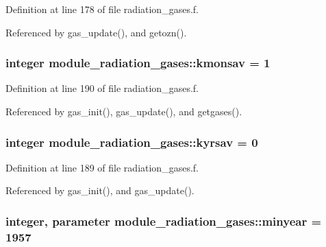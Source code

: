 Definition at line 178 of file radiation\+\_\+gases.\+f.



Referenced by gas\+\_\+update(), and getozn().

\subsubsection[{\texorpdfstring{kmonsav}{kmonsav}}]{\setlength{\rightskip}{0pt plus 5cm}integer module\+\_\+radiation\+\_\+gases\+::kmonsav = 1\hspace{0.3cm}{\ttfamily [private]}}\hypertarget{group__module__radiation__gases_gab1cf1b63398a3e7ec0334a7c97258b4d}{}\label{group__module__radiation__gases_gab1cf1b63398a3e7ec0334a7c97258b4d}


Definition at line 190 of file radiation\+\_\+gases.\+f.



Referenced by gas\+\_\+init(), gas\+\_\+update(), and getgases().

\subsubsection[{\texorpdfstring{kyrsav}{kyrsav}}]{\setlength{\rightskip}{0pt plus 5cm}integer module\+\_\+radiation\+\_\+gases\+::kyrsav = 0\hspace{0.3cm}{\ttfamily [private]}}\hypertarget{group__module__radiation__gases_ga6b4372e633bef3fb367e6ff3cf200bb8}{}\label{group__module__radiation__gases_ga6b4372e633bef3fb367e6ff3cf200bb8}


Definition at line 189 of file radiation\+\_\+gases.\+f.



Referenced by gas\+\_\+init(), and gas\+\_\+update().

\subsubsection[{\texorpdfstring{minyear}{minyear}}]{\setlength{\rightskip}{0pt plus 5cm}integer, parameter module\+\_\+radiation\+\_\+gases\+::minyear = 1957\hspace{0.3cm}{\ttfamily [private]}}\hypertarget{group__module__radiation__gases_ga3b26af64187b57999cadeced419b0f1b}{}\label{group__module__radiation__gases_ga3b26af64187b57999cadeced419b0f1b}


